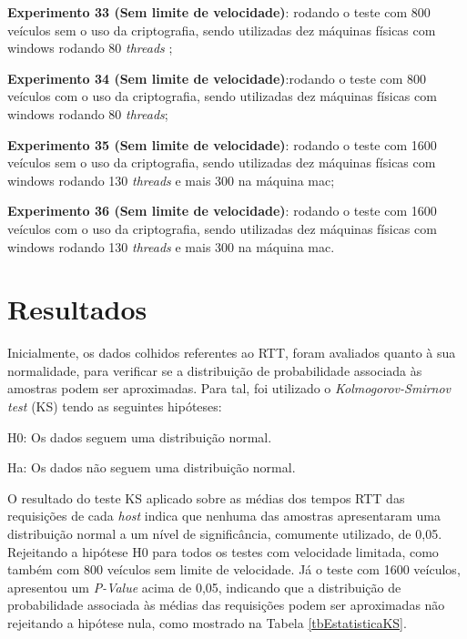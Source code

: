 \documentclass[
	12pt,				%
	oneside,			%
	a4paper,			%
	english,			%
	brazil				%
	]{abntex2ppgsi}
\begin{document}
\begin{itemize*}
	\item{\textbf{Experimento 33 (Sem limite de velocidade)}: rodando o teste com 800  veículos sem o uso da criptografia, sendo utilizadas dez máquinas físicas com windows rodando 80 \textit{threads} ;}	
	\item{\textbf{Experimento 34 (Sem limite de velocidade)}:rodando o teste com 800  veículos com o uso da criptografia, sendo utilizadas dez máquinas físicas com windows rodando 80 \textit{threads};}
	
	\item{\textbf{Experimento 35 (Sem limite de velocidade)}: rodando o teste com 1600  veículos sem o uso da criptografia, sendo utilizadas dez máquinas físicas com windows rodando 130 \textit{threads} e mais 300 na máquina mac;}
	\item{\textbf{Experimento 36 (Sem limite de velocidade)}: rodando o teste com 1600  veículos com o uso da criptografia, sendo utilizadas dez máquinas físicas com windows rodando 130 \textit{threads} e mais 300 na máquina mac.}
\end{itemize*}


\section{Resultados}

Inicialmente, os dados colhidos referentes ao RTT, foram avaliados quanto à sua normalidade, para verificar se a distribuição de probabilidade associada às amostras podem ser aproximadas. Para tal, foi utilizado o \textit{Kolmogorov-Smirnov test} (KS) tendo as seguintes hipóteses:

H0: Os dados seguem uma distribuição normal.

Ha: Os dados não seguem uma distribuição normal.

O resultado do teste KS aplicado sobre as médias dos tempos RTT das requisições de cada \textit{host} indica que nenhuma das amostras apresentaram uma distribuição normal a um nível de significância, comumente utilizado, de 0,05. Rejeitando a hipótese H0 para todos os testes com velocidade limitada, como também com 800 veículos sem limite de velocidade. Já o teste com 1600 veículos, apresentou um \textit{P-Value} acima de 0,05, indicando que a distribuição de probabilidade associada às médias das requisições podem ser aproximadas não rejeitando a hipótese nula, como mostrado na Tabela \ref{tbEstatisticaKS}.
\end{document}

